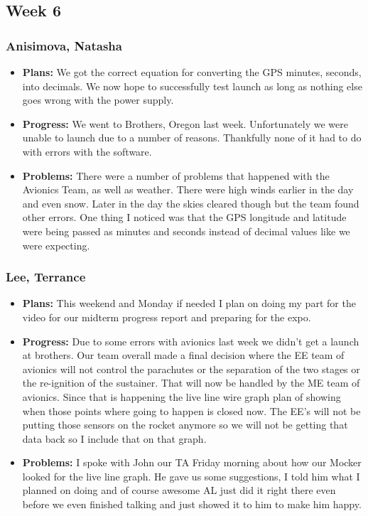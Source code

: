 \documentclass[10pt,draftclsnofoot,onecolumn]{IEEEtran}
\begin{document}
\subsection{Week 6}
\subsubsection{Anisimova, Natasha}
\begin{itemize}
	\item \textbf{Plans: }
	We got the correct equation for converting the GPS minutes, seconds, into decimals. We now hope to successfully test launch as long as nothing else goes wrong with the power supply.
	\item \textbf{Progress:  }
	We went to Brothers, Oregon last week. Unfortunately we were unable to launch due to a number of reasons. Thankfully none of it had to do with errors with the software.
	\item \textbf{Problems: }
	There were a number of problems that happened with the Avionics Team, as well as weather. There were high winds earlier in the day and even snow. Later in the day the skies cleared though but the team found other errors. One thing I noticed was that the GPS longitude and latitude were being passed as minutes and seconds instead of decimal values like we were expecting.
\end{itemize}

\subsubsection{Lee, Terrance}
\begin{itemize}
	\item \textbf{Plans: }
	This weekend and Monday if needed I plan on doing my part for the video for our midterm progress report and preparing for the expo.
	\item \textbf{Progress:  }
	Due to some errors with avionics last week we didn't get a launch at brothers. Our team overall made a final decision where the EE team of avionics will not control the parachutes or the separation of the two stages or the re-ignition of the sustainer. That will now be handled by the ME team of avionics. Since that is happening the live line wire graph plan of showing when those points where going to happen is closed now. The EE's will not be putting those sensors on the rocket anymore so we will not be getting that data back so I include that on that graph.
	\item \textbf{Problems: }
	I spoke with John our TA Friday morning about how our Mocker looked for the live line graph. He gave us some suggestions, I told him what I planned on doing and of course awesome AL just did it right there even before we even finished talking and just showed it to him to make him happy.
\end{itemize}
\end{document}
